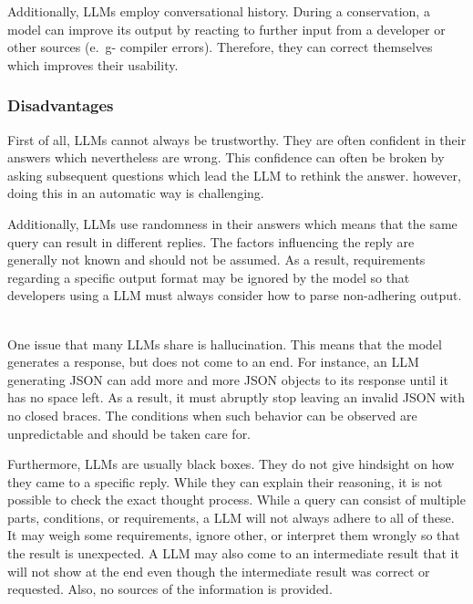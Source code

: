 {Additionally, \acp{LLM} employ conversational history. During a conservation, a model can  improve its output by reacting to further input from a developer or other sources (e.~g- compiler errors). Therefore, they can correct themselves which improves their usability.~\cite{10.1145/3581641.3584037} 




\subsubsection{Disadvantages}

First of all, \acp{LLM} cannot always be trustworthy. They are often confident in their answers which nevertheless are wrong. This confidence can often be broken by asking subsequent questions which lead the \ac{LLM} to rethink the answer. however, doing this in an automatic way is challenging.~\cite{azaria2023internal}

Additionally, \acp{LLM} use randomness in their answers which means that the same query can result in different replies. The factors influencing the reply are generally not known and should not be assumed. As a result, requirements regarding a specific output format may be ignored by the model so that developers using a \ac{LLM} must always consider how to parse non-adhering output. ~\cite{hu2023large}

One issue that many \acp{LLM} share is hallucination. This means that the model generates a response, but does not come to an end. For instance, an \ac{LLM} generating \ac{JSON} can add more and more \ac{JSON} objects to its response until it has no space left. As a result, it must abruptly stop leaving an invalid \ac{JSON} with no closed braces.  The conditions when such behavior can be observed are unpredictable and should be taken care for. 

Furthermore, \ac{LLM}s are usually black boxes. They do not give hindsight on how they came to a specific reply. While they can explain their reasoning, it is not possible to check the exact thought process.
While a query can consist of multiple parts, conditions, or requirements, a \ac{LLM} will not always adhere to all of these. It may weigh some requirements, ignore other, or interpret them wrongly so that the result is unexpected. A \ac{LLM} may also come to an intermediate result that it will not show at the end even though the intermediate result was correct or requested. Also, no sources of the information is provided.~\cite{chen2023instructzero}

}
